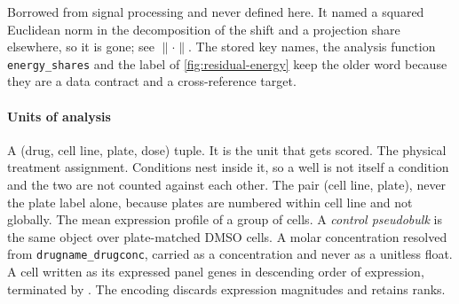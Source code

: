 \begin{description}[leftmargin=1em, itemsep=0.5ex,
                    font=\normalfont\bfseries]
 Borrowed from signal processing and never
  defined here. It named a squared Euclidean norm in the decomposition of the
  shift and a projection share elsewhere, so it is gone; see
  $\lVert\cdot\rVert$. The stored key names, the analysis function
  \texttt{energy\_shares} and the label of \cref{fig:residual-energy} keep the
  older word because they are a data contract and a cross-reference target.
\end{description}

\paragraph{Units of analysis}

\begin{description}[leftmargin=1em, itemsep=0.5ex,
                    font=\normalfont\bfseries]
 A (drug, cell line, plate, dose) tuple. It is the
  unit that gets scored.
 The physical treatment assignment. Conditions
  nest inside it, so a well is not itself a condition and the two are not
  counted against each other.
 The pair (cell line, plate), never the plate
  label alone, because plates are numbered within cell line and not globally.
 The mean expression profile of a group of
  cells. A \emph{control pseudobulk} is the same object over plate-matched DMSO
  cells.
 A molar concentration resolved from
  \texttt{drugname\_drugconc}, carried as a concentration and never as a
  unitless float.
 A cell written as its expressed panel
  genes in descending order of expression, terminated by \ENDCELL. The encoding
  discards expression magnitudes and retains ranks.
\end{description}

